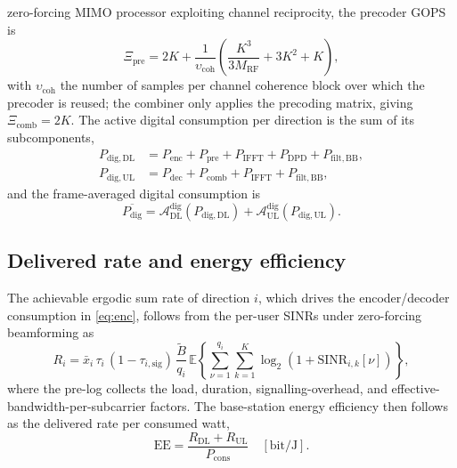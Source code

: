 zero-forcing MIMO processor exploiting channel reciprocity, the precoder GOPS
is 
\begin{equation}
\label{eq:gops_pre}
\Xi_{\mathrm{pre}} = 2K
+ \frac{1}{\upsilon_{\mathrm{coh}}}\!\left(\frac{K^3}{3M_{\mathrm{RF}}}
+ 3K^2 + K\right),
\end{equation}
with $\upsilon_{\mathrm{coh}}$ the number of samples per channel coherence
block over which the precoder is reused; the combiner only applies the
precoding matrix, giving $\Xi_{\mathrm{comb}}=2K$. The active digital
consumption per direction is the sum of its subcomponents,
\begin{align}
P_{\mathrm{dig,DL}} &= P_{\mathrm{enc}} + P_{\mathrm{pre}}
+ P_{\mathrm{IFFT}} + P_{\mathrm{DPD}} + P_{\mathrm{filt,BB}},\\
P_{\mathrm{dig,UL}} &= P_{\mathrm{dec}} + P_{\mathrm{comb}}
+ P_{\mathrm{IFFT}} + P_{\mathrm{filt,BB}},
\end{align}
and the frame-averaged digital consumption is
\begin{equation}
\label{eq:dig_avg}
\overline{P_{\mathrm{dig}}} =
\mathcal{A}_{\mathrm{DL}}^{\mathrm{dig}}\!\left(P_{\mathrm{dig,DL}}\right)
+ \mathcal{A}_{\mathrm{UL}}^{\mathrm{dig}}\!\left(P_{\mathrm{dig,UL}}\right).
\end{equation}

\subsection{Delivered rate and energy efficiency}
\label{sec:rate}
The achievable ergodic sum rate of direction $i$, which drives the
encoder/decoder consumption in \eqref{eq:enc}, follows from the per-user
SINRs under zero-forcing beamforming as
\begin{equation}
\label{eq:rate}
R_i = \bar x_i\,\tau_i\,(1-\tau_{i,\mathrm{sig}})\,\frac{\tilde B}{q_i}\,
\mathbb{E}\!\left\{\sum_{\nu=1}^{q_i}\sum_{k=1}^{K}
\log_2\!\left(1+\mathrm{SINR}_{i,k}[\nu]\right)\right\},
\end{equation}
where the pre-log collects the load, duration, signalling-overhead, and
effective-bandwidth-per-subcarrier factors. The base-station energy efficiency
then follows as the delivered rate per consumed watt,
\begin{equation}
\label{eq:ee}
\mathrm{EE} = \frac{R_{\mathrm{DL}} + R_{\mathrm{UL}}}{P_{\mathrm{cons}}}
\quad[\mathrm{bit/J}].
\end{equation}
